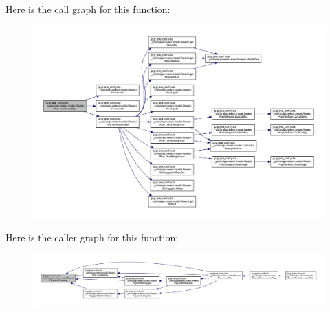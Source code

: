 Here is the call graph for this function\+:
\nopagebreak
\begin{figure}[H]
\begin{center}
\leavevmode
\includegraphics[width=350pt]{classjp_1_1gr_1_1java__conf_1_1yuta__yoshinaga_1_1reversi_1_1model_1_1_reversi_play_a93ebdb5fb7097984730a85f62ebb57d7_cgraph}
\end{center}
\end{figure}
Here is the caller graph for this function\+:
\nopagebreak
\begin{figure}[H]
\begin{center}
\leavevmode
\includegraphics[width=350pt]{classjp_1_1gr_1_1java__conf_1_1yuta__yoshinaga_1_1reversi_1_1model_1_1_reversi_play_a93ebdb5fb7097984730a85f62ebb57d7_icgraph}
\end{center}
\end{figure}
\mbox{\label{classjp_1_1gr_1_1java__conf_1_1yuta__yoshinaga_1_1reversi_1_1model_1_1_reversi_play_a7d60f70e06930069f315cc1d50c502b6}} 
